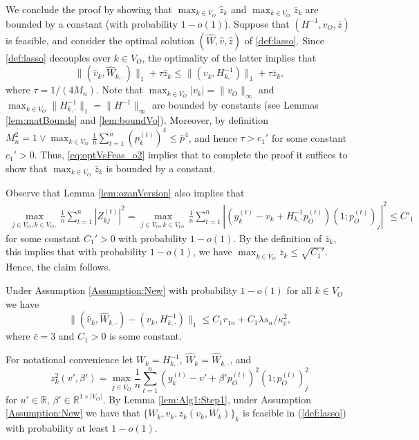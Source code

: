 \documentclass[opre,nonblindrev]{informs3} %
\def\hWk{\hat{W}_{k,\cdot}}
\def\hWkdot{\hat W_{k,\cdot}}
\def\Hinvkdot{H^{-1}_{k,\cdot}}
\begin{document}
\begin{APPENDIX}{}
		We conclude the proof by showing that $\max_{k\in V_O} \hat{z}_k$
and  $\max_{k\in V_O} \bar{z}_k$
are bounded by a constant (with probability $1-o(1)$).
Suppose that $(H^{-1}, v_O, \bar{z})$ is feasible, and consider the optimal solution
$(\hat W, \hat v, \hat {z})$
of \eqref{def:lasso}.
Since \eqref{def:lasso} decouples over $k \in V_O$,
the optimality of the latter implies that 
\begin{equation}\label{eq:optVsFeas_o2}
\| (\hat v_k, \hWkdot )\|_{1} + \tau \hat z_k \leq
\| ( v_k,  H^{-1}_{k,\cdot})\|_{1} +   \tau \bar{z}_k,
\end{equation}		
where
$\tau=1/(4M_n)$.
Note that $\max_{k\in V_O} | v_k|=
\|{v}_O\|_\infty $ and
$\max_{k\in V_O} \| H^{-1}_{k,\cdot}\|_1 = \| H^{-1}\|_\infty$
are bounded by constants   (see Lemmas \ref{lem:matBounds} and  \ref{lem:boundVo}).
Moreover, by definition
$M_n^2= 1\vee \max_{k\in V_O}\frac{1}{n}\sum_{t=1}^n(p_k^{(t)})^4 \leq \bar{p}^4$, and hence
$\tau> c_1'$  for some constant $c_1'>0$.
Thus,
\eqref{eq:optVsFeas_o2} implies that
 to complete the proof
it suffices to show that
$\max_{k\in V_O} \bar{z}_k$ is bounded by a constant.


{Observe that Lemma \ref{lem:ozanVersion} also implies that
\begin{equation}
\begin{aligned}
\max_{j\in \bar V_O ,k\in {V}_O,}
\frac{1}{n}\sum_{t=1}^n|Z^{(t)}_{kj}|^2
=
\max_{j\in \bar V_O ,k\in {V}_O,}
 \frac{1}{n} \sum_{t=1}^n |
(y_k^{(t)} -  v_k + H^{-1}_{k,\cdot}p_O^{(t)})(1;p_O^{(t)})_j|^2
\leq C'_1
\end{aligned}
\end{equation}
for some constant $C_1'>0$ with probability $1-o(1)$.
 	By the definition of $\bar{z}_k$, this implies that with probability $1-o(1)$, we have
$\max_{k\in \bar{V}_O}\bar{z}_k \leq \sqrt{C_1'}$.
Hence, the claim follows.}
\hfill\halmos	
\endproof



\begin{lemma}\label{thm:DS:fast}
	Under Assumption \ref{Assumption:New}
with probability
	$1- o(1)$ for all $k\in V_O$ we have
	$$ \|(\hat v_k, \hWk) - (v_k,
	\Hinvkdot)\|_1 \leq  C_1 r_{1n} + C_1 \lambda s_n/\kappa^2_{\bar c}, $$
	where $\bar c = 3$ and $C_1>0$ 
	is some constant.
\end{lemma}
For notational convenience let $W_k = H^{-1}_{k,\cdot}$,
$\hat{W}_k = \hWkdot$, and
$$z_k^2(v',\beta')=\max_{j\in \bar V_O} \frac{1}{n}\sum_{t=1}^{n} (y_k^{(t)} -  v'+ \beta'p_O^{(t)})^2(1;p_O^{(t)})_j^2$$
for $u'\in \mathbb{R}$, $\beta'\in \mathbb{R}^{1\times |V_O|}$.
By Lemma \ref{lem:Alg1:Step1}, under Assumption \ref{Assumption:New} we have that $\{W_k,v_k,z_k(v_k,W_k)\}_k$ is feasible
in (\ref{def:lasso})  with probability at least $1-o(1)$.



\end{APPENDIX}
\end{document}
